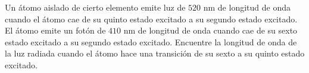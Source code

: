 \item Un átomo aislado de cierto elemento emite luz de $520\text{ nm}$ de longitud de onda cuando el átomo cae de su quinto estado excitado a su segundo estado excitado. El átomo emite un fotón de $410\text{ nm}$ de longitud de onda cuando cae de su sexto estado excitado a su segundo estado excitado. Encuentre la longitud de onda de la luz radiada cuando el átomo hace una transición de su sexto a su quinto estado excitado.